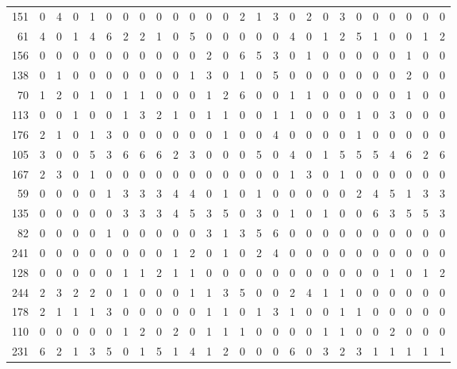 \begin{longtable}{@{\extracolsep{\fill}}rccccccccccccccccccccccccc@{}}
151 & 0 & 4 & 0 & 1 & 0 & 0 & 0 & 0 & 0 & 0 & 0 & 0 & 2 & 1 & 3 & 0 & 2 & 0 & 3 & 0 & 0 & 0 & 0 & 0 & 0 \\
61 & 4 & 0 & 1 & 4 & 6 & 2 & 2 & 1 & 0 & 5 & 0 & 0 & 0 & 0 & 0 & 4 & 0 & 1 & 2 & 5 & 1 & 0 & 0 & 1 & 2 \\
156 & 0 & 0 & 0 & 0 & 0 & 0 & 0 & 0 & 0 & 0 & 2 & 0 & 6 & 5 & 3 & 0 & 1 & 0 & 0 & 0 & 0 & 0 & 1 & 0 & 0 \\
138 & 0 & 1 & 0 & 0 & 0 & 0 & 0 & 0 & 0 & 1 & 3 & 0 & 1 & 0 & 5 & 0 & 0 & 0 & 0 & 0 & 0 & 0 & 2 & 0 & 0 \\
70 & 1 & 2 & 0 & 1 & 0 & 1 & 1 & 0 & 0 & 0 & 1 & 2 & 6 & 0 & 0 & 1 & 1 & 0 & 0 & 0 & 0 & 0 & 1 & 0 & 0 \\
113 & 0 & 0 & 1 & 0 & 0 & 1 & 3 & 2 & 1 & 0 & 1 & 1 & 0 & 0 & 1 & 1 & 0 & 0 & 0 & 1 & 0 & 3 & 0 & 0 & 0 \\
176 & 2 & 1 & 0 & 1 & 3 & 0 & 0 & 0 & 0 & 0 & 0 & 1 & 0 & 0 & 4 & 0 & 0 & 0 & 0 & 1 & 0 & 0 & 0 & 0 & 0 \\
105 & 3 & 0 & 0 & 5 & 3 & 6 & 6 & 6 & 2 & 3 & 0 & 0 & 0 & 5 & 0 & 4 & 0 & 1 & 5 & 5 & 5 & 4 & 6 & 2 & 6 \\
167 & 2 & 3 & 0 & 1 & 0 & 0 & 0 & 0 & 0 & 0 & 0 & 0 & 0 & 0 & 0 & 1 & 3 & 0 & 1 & 0 & 0 & 0 & 0 & 0 & 0 \\
59 & 0 & 0 & 0 & 0 & 1 & 3 & 3 & 3 & 4 & 4 & 0 & 1 & 0 & 1 & 0 & 0 & 0 & 0 & 0 & 2 & 4 & 5 & 1 & 3 & 3 \\
135 & 0 & 0 & 0 & 0 & 0 & 3 & 3 & 3 & 4 & 5 & 3 & 5 & 0 & 3 & 0 & 1 & 0 & 1 & 0 & 0 & 6 & 3 & 5 & 5 & 3 \\
82 & 0 & 0 & 0 & 0 & 1 & 0 & 0 & 0 & 0 & 0 & 3 & 1 & 3 & 5 & 6 & 0 & 0 & 0 & 0 & 0 & 0 & 0 & 0 & 0 & 0 \\
241 & 0 & 0 & 0 & 0 & 0 & 0 & 0 & 0 & 1 & 2 & 0 & 1 & 0 & 2 & 4 & 0 & 0 & 0 & 0 & 0 & 0 & 0 & 0 & 0 & 0 \\
128 & 0 & 0 & 0 & 0 & 0 & 1 & 1 & 2 & 1 & 1 & 0 & 0 & 0 & 0 & 0 & 0 & 0 & 0 & 0 & 0 & 0 & 1 & 0 & 1 & 2 \\
244 & 2 & 3 & 2 & 2 & 0 & 1 & 0 & 0 & 0 & 1 & 1 & 3 & 5 & 0 & 0 & 2 & 4 & 1 & 1 & 0 & 0 & 0 & 0 & 0 & 0 \\
178 & 2 & 1 & 1 & 1 & 3 & 0 & 0 & 0 & 0 & 0 & 1 & 1 & 0 & 1 & 3 & 1 & 0 & 0 & 1 & 1 & 0 & 0 & 0 & 0 & 0 \\
110 & 0 & 0 & 0 & 0 & 0 & 1 & 2 & 0 & 2 & 0 & 1 & 1 & 1 & 0 & 0 & 0 & 0 & 1 & 1 & 0 & 0 & 2 & 0 & 0 & 0 \\
231 & 6 & 2 & 1 & 3 & 5 & 0 & 1 & 5 & 1 & 4 & 1 & 2 & 0 & 0 & 0 & 6 & 0 & 3 & 2 & 3 & 1 & 1 & 1 & 1 & 1 \\

\end{longtable}
